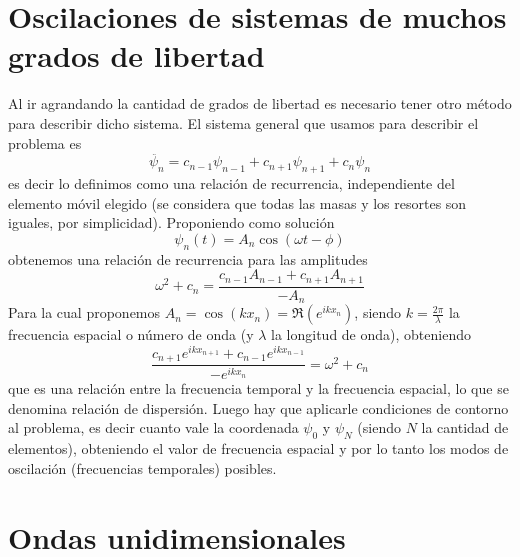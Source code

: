\documentclass[a4paper]{article}
\numberwithin{equation}{section}
\begin{document}
\section{Oscilaciones de sistemas de muchos grados de libertad}
	  \label{sec:oscilador_recurrencia}
	  Al ir agrandando la cantidad de grados de libertad es necesario tener otro método para describir dicho sistema. El sistema general que usamos para describir el problema es
	  \begin{equation}
		\ddot{\psi_n} = c_{n-1} \psi_{n-1} + c_{n+1} \psi_{n+1} + c_n \psi_n
		\label{eq:oscilador_recurrencia}
	  \end{equation}
	  es decir lo definimos como una relación de recurrencia, independiente del elemento móvil elegido (se considera que todas las masas y los resortes son iguales, por simplicidad). Proponiendo como solución
	  \begin{equation}
		 \psi_n(t) = A_n \cos(\omega t - \phi)
		 \label{eq:oscilador_recurrencia_solucion}
	  \end{equation}
	  obtenemos una relación de recurrencia para las amplitudes
	  \begin{equation}
		 \omega^2 + c_n = \frac{c_{n-1} A_{n-1} + c_{n+1} A_{n+1}}{-A_n}
		 \label{eq:oscilador_recurrencia_relacion}
	   \end{equation}
	   Para la cual proponemos $A_n = \cos(k x_n) = \Re(e^{i k x_n})$, siendo $k = \frac{2 \pi}{\lambda}$ la frecuencia espacial o número de onda (y $\lambda$ la longitud de onda), obteniendo
	   \begin{equation}
			\frac{c_{n+1} e^{i k x_{n+1}} + c_{n-1} e^{i k x_{n-1}}}{-e^{i k x_n}} = \omega^2 + c_n
			\label{eq:oscilador_recurrencia_rel_dispersion}
	   \end{equation}
	   que es una relación entre la frecuencia temporal y la frecuencia espacial, lo que se denomina relación de dispersión. 
	   Luego hay que aplicarle condiciones de contorno al problema, es decir cuanto vale la coordenada $\psi_0$ y $\psi_N$ (siendo $N$ la cantidad de elementos), obteniendo el valor de frecuencia espacial y por lo tanto los modos de oscilación (frecuencias temporales) posibles.
\section{Ondas unidimensionales}
\end{document}
